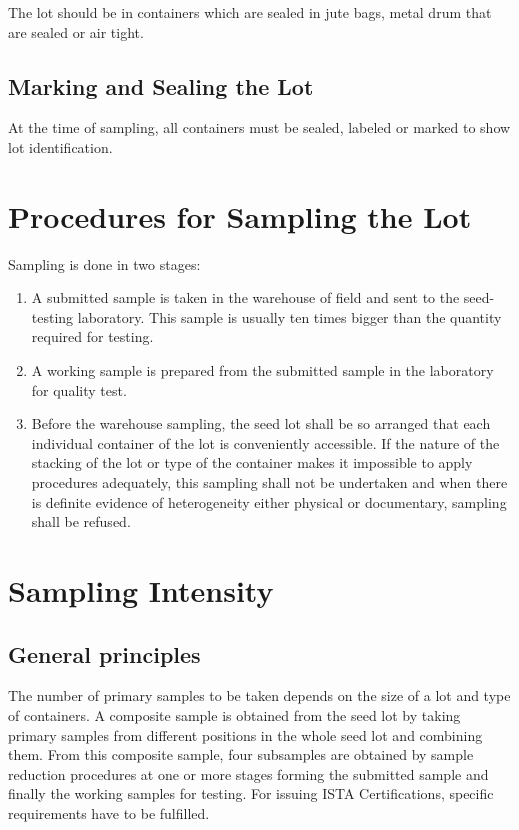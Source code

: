 \documentclass[]{book}
\providecommand{\tightlist}{%
  \setlength{\itemsep}{0pt}\setlength{\parskip}{0pt}}
\begin{document}
The lot should be in containers which are sealed in jute bags, metal
drum that are sealed or air tight.

\subsection{Marking and Sealing the
Lot}\label{marking-and-sealing-the-lot}

At the time of sampling, all containers must be sealed, labeled or
marked to show lot identification.

\section{Procedures for Sampling the
Lot}\label{procedures-for-sampling-the-lot}

Sampling is done in two stages:

\begin{enumerate}
\def\labelenumi{\arabic{enumi}.}
\tightlist
\item
  A submitted sample is taken in the warehouse of field and sent to the
  seed-testing laboratory. This sample is usually ten times bigger than
  the quantity required for testing.
\item
  A working sample is prepared from the submitted sample in the
  laboratory for quality test.
\item
  Before the warehouse sampling, the seed lot shall be so arranged that
  each individual container of the lot is conveniently accessible. If
  the nature of the stacking of the lot or type of the container makes
  it impossible to apply procedures adequately, this sampling shall not
  be undertaken and when there is definite evidence of heterogeneity
  either physical or documentary, sampling shall be refused.
\end{enumerate}

\section{Sampling Intensity}\label{sampling-intensity}

\subsection{General principles}\label{general-principles}

The number of primary samples to be taken depends on the size of a lot
and type of containers. A composite sample is obtained from the seed lot
by taking primary samples from different positions in the whole seed lot
and combining them. From this composite sample, four subsamples are
obtained by sample reduction procedures at one or more stages forming
the submitted sample and finally the working samples for testing. For
issuing ISTA Certifications, specific requirements have to be fulfilled.
\end{document}
